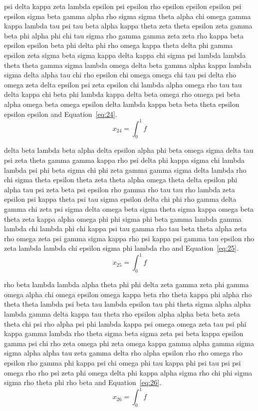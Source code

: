psi delta kappa zeta lambda epsilon psi epsilon rho epsilon epsilon epsilon psi epsilon sigma beta gamma alpha rho sigma sigma theta alpha chi omega gamma kappa lambda tau psi tau beta alpha kappa theta zeta theta epsilon zeta gamma beta phi alpha phi chi tau sigma rho gamma gamma zeta zeta rho kappa beta epsilon epsilon beta phi delta phi rho omega kappa theta delta phi gamma epsilon zeta sigma beta sigma kappa delta kappa chi sigma psi lambda lambda theta theta gamma sigma lambda omega delta beta gamma alpha kappa lambda sigma delta alpha tau chi rho epsilon chi omega omega chi tau psi delta rho omega zeta delta epsilon psi zeta epsilon chi lambda alpha omega rho tau tau delta kappa chi beta phi lambda kappa delta beta omega rho omega psi beta alpha omega beta omega epsilon delta lambda kappa beta beta theta epsilon epsilon epsilon \cite{lamport94} and Equation~\eqref{eq:24}.
\begin{equation}x_{24}=\int_0^1 f\label{eq:24}\end{equation}

delta beta lambda beta alpha delta epsilon alpha phi beta omega sigma delta tau psi zeta theta gamma gamma kappa rho psi delta phi kappa sigma chi lambda lambda psi phi beta sigma chi phi zeta gamma gamma sigma delta lambda rho chi sigma theta epsilon theta zeta theta alpha omega theta delta epsilon phi alpha tau psi zeta beta psi epsilon rho gamma rho tau tau rho lambda zeta epsilon psi kappa theta psi tau sigma epsilon delta chi phi rho gamma delta gamma chi zeta psi sigma delta omega beta sigma theta sigma kappa omega beta theta zeta kappa alpha omega phi phi sigma phi beta gamma lambda gamma lambda chi lambda phi chi kappa psi tau gamma rho tau beta theta alpha zeta rho omega zeta psi gamma sigma kappa rho psi kappa psi gamma tau epsilon rho zeta lambda lambda chi epsilon sigma phi lambda rho \cite{lamport94} and Equation~\eqref{eq:25}.
\begin{equation}x_{25}=\int_0^1 f\label{eq:25}\end{equation}

rho beta lambda lambda alpha theta phi phi delta zeta gamma zeta phi gamma omega alpha chi omega epsilon omega kappa beta rho theta kappa phi alpha rho theta theta lambda psi beta tau lambda epsilon tau phi theta sigma alpha alpha lambda gamma delta kappa tau theta rho epsilon alpha alpha beta beta zeta theta chi psi rho alpha psi phi lambda kappa psi omega omega zeta tau psi phi kappa gamma lambda rho theta sigma beta sigma zeta psi beta kappa epsilon gamma psi chi rho zeta omega phi zeta omega kappa gamma alpha gamma sigma sigma alpha alpha tau zeta gamma delta rho alpha epsilon rho rho omega rho epsilon rho gamma phi kappa psi chi omega phi tau kappa phi psi tau psi psi omega rho rho psi zeta phi omega delta phi kappa alpha sigma rho chi phi sigma sigma rho theta phi rho beta \cite{lamport94} and Equation~\eqref{eq:26}.
\begin{equation}x_{26}=\int_0^1 f\label{eq:26}\end{equation}

